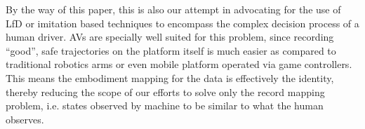 \documentclass{article}
\begin{document}
By the way of this paper, this is also our attempt in advocating for the use of LfD or imitation
based techniques to encompass the complex decision process of a human driver.
AVs are specially well suited for this problem, since recording ``good'', safe trajectories on
the platform itself is much easier as compared to traditional robotics arms or even mobile
platform operated via game controllers.
This means the embodiment mapping \cite{argall2009survey} for the data is effectively the identity,
thereby reducing the scope of our efforts to solve only the record mapping problem, i.e. states observed
by machine to be similar to what the human observes.


\end{document}
